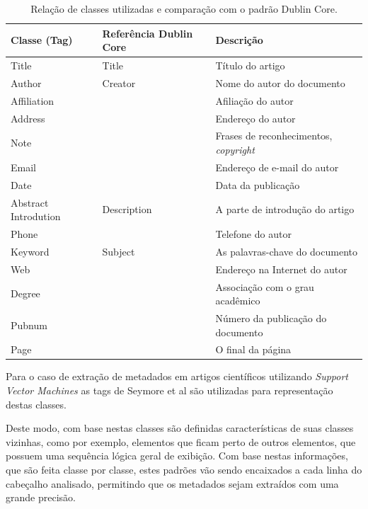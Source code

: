 \documentclass[
	12pt,               %
	openright,          %
	twoside,            %
	a4paper,            %
	english,            %
	brazil              %
	]{abntex2}
\begin{document}
\begin{table}
    \caption{Relação de classes utilizadas e comparação com o padrão Dublin Core.}
    \begin{center}
        \begin{tabular}{|C{3cm}|C{3cm}|p{7cm}|}
            \hline \textbf{Classe (Tag)} & \textbf{Referência Dublin Core} & \textbf{Descrição}\\ 
            \hline Title & Title & Título do artigo\\
            \hline Author & Creator & Nome do autor do documento\\
            \hline Affiliation & & Afiliação do autor\\
            \hline Address & & Endereço do autor\\
            \hline Note & & Frases de reconhecimentos, \textit{copyright}\\
            \hline Email & & Endereço de e-mail do autor\\
            \hline Date & & Data da publicação\\
            \hline Abstract Introdution & Description & A parte de introdução do artigo\\
            \hline Phone & & Telefone do autor\\
            \hline Keyword & Subject & As palavras-chave do documento\\
            \hline Web & & Endereço na Internet do autor\\
            \hline Degree & & Associação com o grau acadêmico\\
            \hline Pubnum & & Número da publicação do documento\\
            \hline Page & & O final da página\\
            \hline
        \end{tabular}
    \end{center}
    \label{tab:svm-classes}
\end{table}

Para o caso de extração de metadados em artigos científicos utilizando \textit{Support Vector Machines} \cite{svm} as tags de Seymore et al \cite{seymore} são utilizadas para representação destas classes.

Deste modo, com base nestas classes são definidas características de suas classes vizinhas, como por exemplo, elementos que ficam perto de outros elementos, que possuem uma sequência lógica geral de exibição. Com base nestas informações, que são feita classe por classe, estes padrões vão sendo encaixados a cada linha do cabeçalho analisado, permitindo que os metadados sejam extraídos com uma grande precisão.
\end{document}
